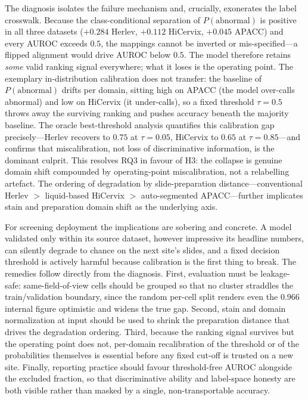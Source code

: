 The diagnosis isolates the failure mechanism and, crucially, exonerates the label crosswalk. Because the class-conditional separation of $P(\text{abnormal})$ is positive in all three datasets ($+0.284$ Herlev, $+0.112$ HiCervix, $+0.045$ APACC) and every AUROC exceeds $0.5$, the mappings cannot be inverted or mis-specified---a flipped alignment would drive AUROC below $0.5$. The model therefore retains \emph{some} valid ranking signal everywhere; what it loses is the operating point. The exemplary in-distribution calibration does not transfer: the baseline of $P(\text{abnormal})$ drifts per domain, sitting high on APACC (the model over-calls abnormal) and low on HiCervix (it under-calls), so a fixed threshold $\tau=0.5$ throws away the surviving ranking and pushes accuracy beneath the majority baseline. The oracle best-threshold analysis quantifies this calibration gap precisely---Herlev recovers to $0.75$ at $\tau=0.05$, HiCervix to $0.65$ at $\tau=0.85$---and confirms that miscalibration, not loss of discriminative information, is the dominant culprit. This resolves RQ3 in favour of H3: the collapse is genuine domain shift compounded by operating-point miscalibration, not a relabelling artefact. The ordering of degradation by slide-preparation distance---conventional Herlev $>$ liquid-based HiCervix $>$ auto-segmented APACC---further implicates stain and preparation domain shift as the underlying axis.

For screening deployment the implications are sobering and concrete. A model validated only within its source dataset, however impressive its headline numbers, can silently degrade to chance on the next site's slides, and a fixed decision threshold is actively harmful because calibration is the first thing to break. The remedies follow directly from the diagnosis. First, evaluation must be leakage-safe: same-field-of-view cells should be grouped so that no cluster straddles the train/validation boundary, since the random per-cell split renders even the $0.966$ internal figure optimistic and widens the true gap. Second, stain and domain normalization at input \citep{macenko2009stain} should be used to shrink the preparation distance that drives the degradation ordering. Third, because the ranking signal survives but the operating point does not, per-domain recalibration of the threshold or of the probabilities themselves \citep{guo2017calibration} is essential before any fixed cut-off is trusted on a new site. Finally, reporting practice should favour threshold-free AUROC alongside the excluded fraction, so that discriminative ability and label-space honesty are both visible rather than masked by a single, non-transportable accuracy.

